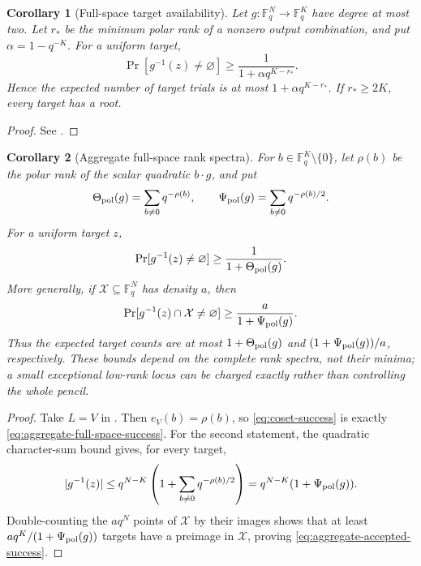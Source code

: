 \documentclass[11pt]{article}
\newtheorem{corollary}[corollary]{Corollary}
\newcommand{\F}{\mathbb F}
\begin{document}
\begin{corollary}[Full-space target availability]\label{cor:full-space}
Let $g:\F_q^N\to\F_q^K$ have degree at most two.  Let $r_*$ be the
minimum polar rank of a nonzero output combination, and put
$\alpha=1-q^{-K}$.  For a uniform target,
\begin{equation}\label{eq:full-space-success}
 \Pr[g^{-1}(z)\ne\varnothing]
 \ge \frac{1}{1+\alpha q^{K-r_*}}.
\end{equation}
Hence the expected number of target trials is at most
$1+\alpha q^{K-r_*}$.  If $r_*\ge2K$, every target has a root.
\end{corollary}

\begin{proof}
See .
\end{proof}

\begin{corollary}[Aggregate full-space rank spectra]
\label{cor:aggregate-full-space}
For $b\in\F_q^K\setminus\{0\}$, let $\rho(b)$ be the polar rank of the scalar
quadratic $b\cdot g$, and put
\begin{equation}\label{eq:aggregate-polar-spectra}
 \Theta_{\rm pol}(g)=\sum_{b\ne0}q^{-\rho(b)},
 \qquad
 \Psi_{\rm pol}(g)=\sum_{b\ne0}q^{-\rho(b)/2}.
\end{equation}
For a uniform target $z$,
\begin{equation}\label{eq:aggregate-full-space-success}
 \Pr[g^{-1}(z)\ne\varnothing]\ge\frac{1}{1+\Theta_{\rm pol}(g)}.
\end{equation}
More generally, if $\mathcal X\subseteq\F_q^N$ has density $a$, then
\begin{equation}\label{eq:aggregate-accepted-success}
 \Pr[g^{-1}(z)\cap\mathcal X\ne\varnothing]
 \ge\frac{a}{1+\Psi_{\rm pol}(g)}.
\end{equation}
Thus the expected target counts are at most $1+\Theta_{\rm pol}(g)$ and
$(1+\Psi_{\rm pol}(g))/a$, respectively.  These bounds depend on the complete
rank spectra, not their minima; a small exceptional low-rank locus can be
charged exactly rather than controlling the whole pencil.
\end{corollary}

\begin{proof}
Take $L=V$ in .  Then $e_V(b)=\rho(b)$, so
\eqref{eq:coset-success} is exactly
\eqref{eq:aggregate-full-space-success}.  For the second statement, the
quadratic character-sum bound gives, for every target,
\[
 |g^{-1}(z)|
 \le q^{N-K}\left(1+\sum_{b\ne0}q^{-\rho(b)/2}\right)
 =q^{N-K}(1+\Psi_{\rm pol}(g)).
\]
Double-counting the $a q^N$ points of $\mathcal X$ by their images shows that
at least $a q^K/(1+\Psi_{\rm pol}(g))$ targets have a preimage in
$\mathcal X$, proving \eqref{eq:aggregate-accepted-success}.
\end{proof}
\end{document}
